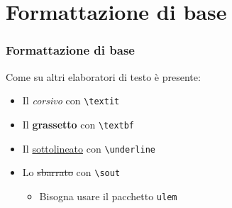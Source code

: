 \section{Formattazione di base}
\begin{frame}
 \frametitle{Formattazione di base}
 
 Come su altri elaboratori di testo è presente:
 \begin{itemize}
  \item<1-> Il \textit{corsivo} con \texttt{\textbackslash textit}
  \item<2-> Il \textbf{grassetto} con \texttt{\textbackslash textbf}
  \item<3-> Il \underline{sottolineato} con \texttt{\textbackslash underline}
  \item<4-> Lo \sout{sbarrato} con \texttt{\textbackslash sout}
  \begin{itemize}
   \item Bisogna usare il pacchetto \texttt{ulem}
  \end{itemize}

 \end{itemize}

\end{frame}
